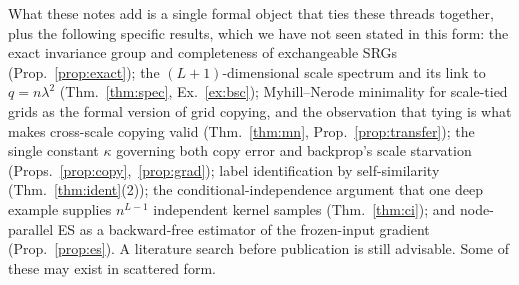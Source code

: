 \documentclass[11pt]{article}
\theoremstyle{definition}
\begin{document}
What these notes add is a single formal object that ties these threads together, plus the
following specific results, which we have not seen stated in this form:
the exact invariance group and completeness of exchangeable SRGs (Prop.~\ref{prop:exact});
the $(L{+}1)$-dimensional scale spectrum and its link to $q=n\lambda^2$ (Thm.~\ref{thm:spec},
Ex.~\ref{ex:bsc}); Myhill--Nerode minimality for scale-tied grids as the formal version of grid
copying, and the observation that tying is what makes cross-scale copying valid
(Thm.~\ref{thm:mn}, Prop.~\ref{prop:transfer}); the single constant $\kappa$ governing both copy
error and backprop's scale starvation (Props.~\ref{prop:copy},~\ref{prop:grad}); label
identification by self-similarity (Thm.~\ref{thm:ident}(2)); the conditional-independence
argument that one deep example supplies $n^{L-1}$ independent kernel samples (Thm.~\ref{thm:ci});
and node-parallel ES as a backward-free estimator of the frozen-input gradient
(Prop.~\ref{prop:es}). A literature search before publication is still advisable. Some of these
may exist in scattered form.

\end{document}
